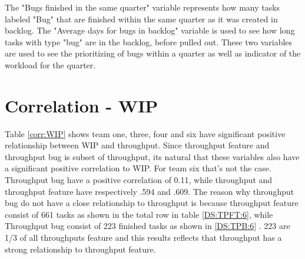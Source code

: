 \documentclass[UKenglish]{ifimaster}  %
\begin{document}
The "Bugs finished in the same quarter" variable represents how many tasks labeled "Bug" that are finished within the same quarter as it was created in backlog.  The "Average days for bugs in backlog" variable is used to see how long tasks with type "bug" are in the backlog, before pulled out. These two variables are used to see the prioritizing of bugs within a quarter as well as indicator of the workload for the quarter.   




\section{Correlation - WIP}
\label{sec:corr:WIP}
Table  \ref{corr:WIP} shows team one, three, four and six have significant positive relationship between WIP and throughput.  Since throughput feature and throughput bug is subset of throughput, its natural that these variables also have a significant positive correlation to WIP.  For team six that's not the case. Throughput bug have a positive correlation of 0.11, while throughput and throughput feature have respectively .594 and .609. The reason why throughput bug do not have a close relationship to throughput is because throughput feature consist of 661 tasks as shown in the total row in table \ref{DS:TPFT:6}, while Throughput bug consist of 223 finished tasks as shown in \ref{DS:TPB:6} . 223 are 1/3 of all throughputs feature and this results reflects that throughput has a strong relationship to throughput feature. 
\end{document}
